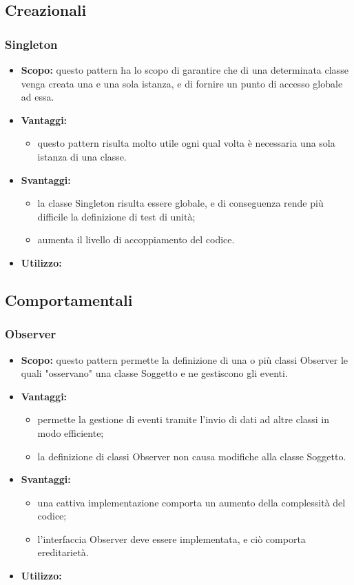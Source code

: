   \subsection{Creazionali}
  
    \subsubsection{Singleton}
      \begin{itemize}
       \item \textbf{Scopo:} questo pattern ha lo scopo di garantire che di una determinata classe venga creata una e una sola istanza, e di fornire un punto di accesso globale ad essa.
	\item \textbf{Vantaggi:}
	  \begin{itemize}
	   \item questo pattern risulta molto utile ogni qual volta è necessaria una sola istanza di una classe.
	  \end{itemize}
	\item \textbf{Svantaggi:}
	  \begin{itemize}
	   \item la classe Singleton risulta essere globale, e di conseguenza rende più difficile la definizione di test di unità;
	   \item aumenta il livello di accoppiamento del codice.
	  \end{itemize}
	\item \textbf{Utilizzo:}
	\end{itemize}
	
  \subsection{Comportamentali}
  
    \subsubsection{Observer}
      \begin{itemize}
       \item \textbf{Scopo:} questo pattern permette la definizione di una o più classi Observer le quali "osservano" una classe Soggetto e ne gestiscono gli eventi.
	\item \textbf{Vantaggi:}
	  \begin{itemize}
	   \item permette la gestione di eventi tramite l'invio di dati ad altre classi in modo efficiente;
	   \item la definizione di classi Observer non causa modifiche alla classe Soggetto. 
	  \end{itemize}
	\item \textbf{Svantaggi:}
	  \begin{itemize}
	   \item una cattiva implementazione comporta un aumento della complessità del codice;
	   \item l'interfaccia Observer deve essere implementata, e ciò comporta ereditarietà.
	  \end{itemize}
	\item \textbf{Utilizzo:}
	\end{itemize}
	
